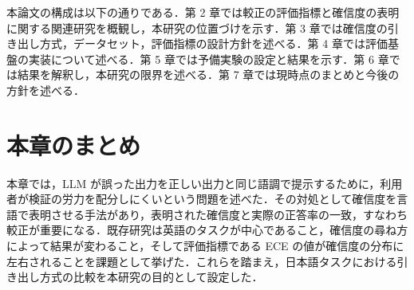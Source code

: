 本論文の構成は以下の通りである．第 2 章では較正の評価指標と確信度の表明に関する関連研究を概観し，本研究の位置づけを示す．第 3 章では確信度の引き出し方式，データセット，評価指標の設計方針を述べる．第 4 章では評価基盤の実装について述べる．第 5 章では予備実験の設定と結果を示す．第 6 章では結果を解釈し，本研究の限界を述べる．第 7 章では現時点のまとめと今後の方針を述べる．

\section{本章のまとめ}

本章では，LLM が誤った出力を正しい出力と同じ語調で提示するために，利用者が検証の労力を配分しにくいという問題を述べた．その対処として確信度を言語で表明させる手法があり，表明された確信度と実際の正答率の一致，すなわち較正が重要になる．既存研究は英語のタスクが中心であること，確信度の尋ね方によって結果が変わること，そして評価指標である ECE の値が確信度の分布に左右されることを課題として挙げた．これらを踏まえ，日本語タスクにおける引き出し方式の比較を本研究の目的として設定した．
